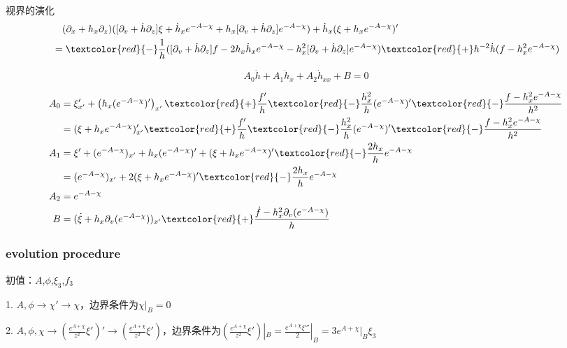 \documentclass[12pt,a4paper]{ctexart}
\numberwithin{equation}{section}
\begin{document}
视界的演化
\begin{equation}
    \begin{aligned}
        &\quad(\partial_{x}+h_{x}\partial_{z})([\partial_{v}+\dot{h}\partial_{z}]\xi+\dot{h}_{x}e^{-A-\chi}+h_{x}[\partial_{v}+\dot{h}\partial_{z}]e^{-A-\chi})+\dot{h}_{x}(\xi+h_{x}e^{-A-\chi})^{\prime}\\
        &=\textcolor{red}{-}\frac{1}{h}([\partial_{v}+\dot{h}\partial_{z}]f-2h_{x}\dot{h}_{x}e^{-A-\chi}-h_{x}^{2}[\partial_{v}+\dot{h}\partial_{z}]e^{-A-\chi})\textcolor{red}{+}h^{-2}\dot{h}(f-h_{x}^{2}e^{-A-\chi})
    \end{aligned}
\end{equation}

\begin{equation}
    A_0\dot{h}+A_1\dot{h}_x+A_2\dot{h}_{xx}+B=0
\end{equation}

\begin{equation}
    \begin{aligned}
        A_0&=\xi'_{x'}+\left(h_x(e^{-A-\chi})'\right)_{x'}\textcolor{red}{+}\frac{f'}{h}\textcolor{red}{-}\frac{h_x^2}{h}(e^{-A-\chi})'\textcolor{red}{-}\frac{f-h_x^2 e^{-A-\chi}}{h^2}\\
        &=(\xi+h_xe^{-A-\chi})'_{x'}\textcolor{red}{+}\frac{f'}{h}\textcolor{red}{-}\frac{h_x^2}{h}(e^{-A-\chi})'\textcolor{red}{-}\frac{f-h_x^2 e^{-A-\chi}}{h^2}\\
        A_1&=\xi'+(e^{-A-\chi})_{x'}+h_x(e^{-A-\chi})'+(\xi+h_x e^{-A-\chi})'\textcolor{red}{-}\frac{2h_x}{h}e^{-A-\chi}\\
        &=(e^{-A-\chi})_{x'}+2(\xi+h_x e^{-A-\chi})'\textcolor{red}{-}\frac{2h_x}{h}e^{-A-\chi}\\
        A_2&=e^{-A-\chi}\\
        B&=(\dot{\xi}+h_x\partial_v(e^{-A-\chi}))_{x'}\textcolor{red}{+}\frac{\dot{f}-h_x^2\partial_v(e^{-A-\chi})}{h}
    \end{aligned}
\end{equation}

\subsubsection{evolution procedure}

初值：$A$,$\phi$,$\xi_3$,$f_3$

1. $A,\phi\rightarrow\chi'\rightarrow\chi$，边界条件为$\chi|_B=0$

2. $A,\phi,\chi\rightarrow\left(\frac{e^{A+\chi}}{z^2}\xi'\right)'\rightarrow\left(\frac{e^{A+\chi}}{z^2}\xi'\right)$，边界条件为$\left(\frac{e^{A+\chi}}{z^2}\xi'\right)|_B=\frac{e^{A+\chi}\xi'''}{2}|_B=3e^{A+\chi}|_B\xi_3$
\end{document}
